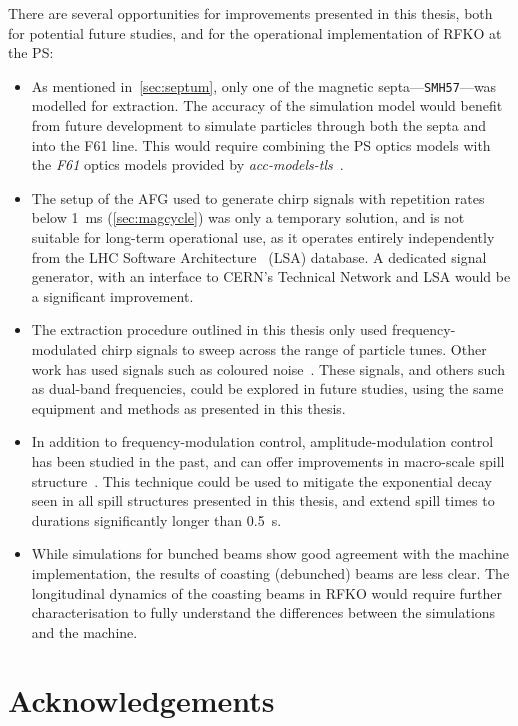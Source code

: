 \documentclass[11pt]{report}
\begin{document}
There are several opportunities for improvements presented in this thesis, both for potential future studies, and for the operational implementation of RFKO at the PS:
\begin{itemize}
  \item As mentioned in~\autoref{sec:septum}, only one of the magnetic septa---\verb|SMH57|---was modelled for extraction. The accuracy of the simulation model would benefit from future development to simulate particles through both the septa and into the F61 line. This would require combining the PS optics models with the \textit{F61} optics models provided by \textit{acc-models-tls}~\cite{optics_repo}.
  \item The setup of the AFG used to generate chirp signals with repetition rates below \qty{1}{\milli\second} (\autoref{sec:magcycle}) was only a temporary solution, and is not suitable for long-term operational use, as it operates entirely independently from the LHC Software Architecture~\cite{Roderick:1215575} (LSA) database. A dedicated signal generator, with an interface to CERN's Technical Network and LSA would be a significant improvement.
  \item The extraction procedure outlined in this thesis only used frequency-modulated chirp signals to sweep across the range of particle tunes. Other work has used signals such as coloured noise~\cite{Nagaslaev:2011zz}. These signals, and others such as dual-band frequencies, could be explored in future studies, using the same equipment and methods as presented in this thesis.
  \item In addition to frequency-modulation control, amplitude-modulation control has been studied in the past, and can offer improvements in macro-scale spill structure~\cite{NODA2002241}. This technique could be used to mitigate the exponential decay seen in all spill structures presented in this thesis, and extend spill times to durations significantly longer than \qty{0.5}{\second}.
  \item While simulations for bunched beams show good agreement with the machine implementation, the results of coasting (debunched) beams are less clear. The longitudinal dynamics of the coasting beams in RFKO would require further characterisation to fully understand the differences between the simulations and the machine.
\end{itemize}


\chapter{Acknowledgements}

 
 
\end{document}
